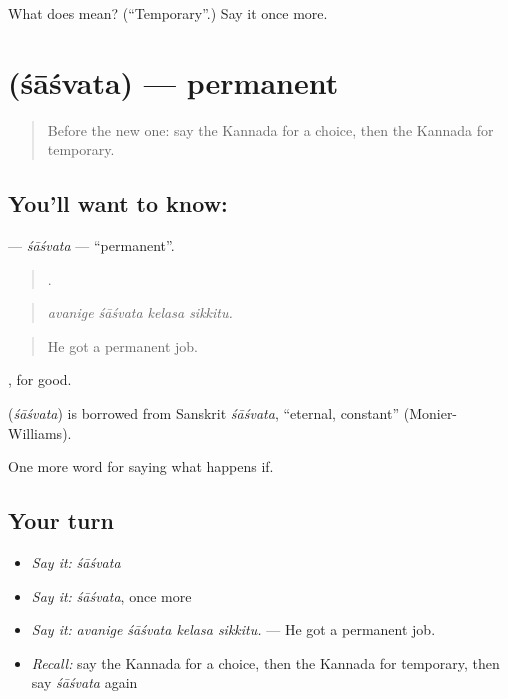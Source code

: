 \begin{tcolorbox}[breakable,colback=teal!4,colframe=teal!35!black,title={Before you move on}]
What does  mean? (\textquotedblleft{}Temporary\textquotedblright{}.) Say it once more.
\end{tcolorbox}
\section[\texorpdfstring{\kn{ಶಾಶ್ವತ} (śāśvata)}{ಶಾಶ್ವತ (śāśvata)}]{ (śāśvata) — permanent}

\label{lesson:KA-C418-sasvata}



\begin{quote}
Before the new one: say the Kannada for a choice, then the Kannada for temporary.
\end{quote}

\subsection*{You'll want to know: }
\textbf{} — \emph{śāśvata} — \textquotedblleft{}permanent\textquotedblright{}.

\begin{quote}
   .
\end{quote}

\begin{quote}
\emph{avanige śāśvata kelasa sikkitu.}
\end{quote}

\begin{quote}
He got a permanent job.
\end{quote}

, for good.

\begin{cousinweb}
\textbf{} (\emph{śāśvata}) is borrowed from Sanskrit \emph{śāśvata}, \textquotedblleft{}eternal, constant\textquotedblright{} (Monier-Williams).
\end{cousinweb}

\begin{grammarlens}[title={What you've built}]
One more word for saying what happens if.
\end{grammarlens}

\subsection*{Your turn}
\begin{itemize}
\raggedright
  \item \emph{Say it:} \emph{śāśvata}
  \item \emph{Say it:} \emph{śāśvata}, once more
  \item \emph{Say it:} \emph{avanige śāśvata kelasa sikkitu.} — He got a permanent job.
  \item \emph{Recall:} say the Kannada for a choice, then the Kannada for temporary, then say \emph{śāśvata} again
\end{itemize}

